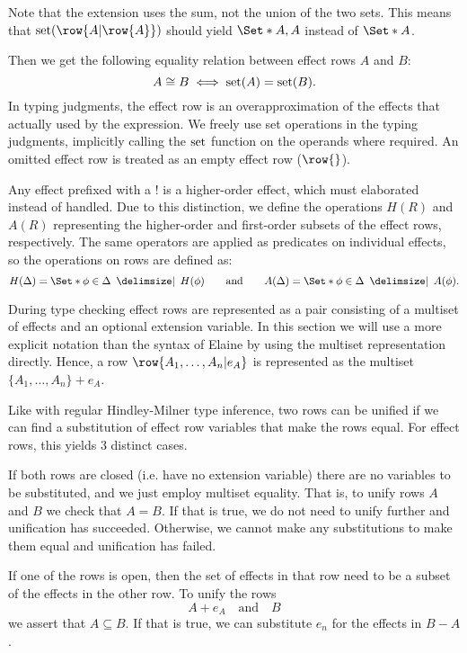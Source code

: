 Note that the extension uses the sum, not the union of the two sets. This means that $\set(\row{A | \row{A}})$ should yield $\S{A, A}$ instead of $\S{A}$.

Then we get the following equality relation between effect rows $A$ and $B$:
\[ A \cong B \iff \operatorname{set}(A) = \operatorname{set}(B). \]
In typing judgments, the effect row is an overapproximation of the effects that actually used by the expression. We freely use set operations in the typing judgments, implicitly calling the $\operatorname{set}$ function on the operands where required. An omitted effect row is treated as an empty effect row ($\row{}$).

Any effect prefixed with a $!$ is a higher-order effect, which must elaborated instead of handled. Due to this distinction, we define the operations $H(R)$ and $A(R)$ representing the higher-order and first-order subsets of the effect rows, respectively. The same operators are applied as predicates on individual effects, so the operations on rows are defined as:
\[ 
    H(\Delta) = \S{ \phi \in \Delta \given H(\phi) }
    \qquad
    \text{and}
    \qquad
    A(\Delta) = \S{ \phi \in \Delta \given A(\phi) }.
\]


During type checking effect rows are represented as a pair consisting of a multiset of effects and an optional extension variable. In this section we will use a more explicit notation than the syntax of Elaine by using the multiset representation directly. Hence, a row $\row{A_1,\dots,A_n|e_A}$ is represented as the multiset $\{A_1,\dots,A_n\} + e_A$.

Like with regular Hindley-Milner type inference, two rows can be unified if we can find a substitution of effect row variables that make the rows equal. For effect rows, this yields 3 distinct cases.

If both rows are closed (i.e. have no extension variable) there are no variables to be substituted, and we just employ multiset equality. That is, to unify rows $A$ and $B$ we check that $A = B$. If that is true, we do not need to unify further and unification has succeeded. Otherwise, we cannot make any substitutions to make them equal and unification has failed.

If one of the rows is open, then the set of effects in that row need to be a subset of the effects in the other row. To unify the rows
\[ A + e_A \quad\text{and}\quad B \]
we assert that $A \subseteq B$. If that is true, we can substitute $e_n$ for the effects in $B - A$.

